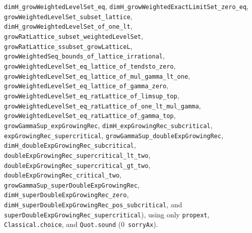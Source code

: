 \documentclass[11pt]{article}
\theoremstyle{definition}
\theoremstyle{remark}
\begin{document}
\texttt{dimH\_\allowbreak grow\allowbreak Weighted\allowbreak LevelSet\_\allowbreak eq},
\texttt{dimH\_\allowbreak grow\allowbreak Weighted\allowbreak ExactLimitSet\_\allowbreak zero\_\allowbreak eq},
\texttt{grow\allowbreak Weighted\allowbreak LevelSet\_\allowbreak subset\_\allowbreak lattice},
\texttt{dimH\_\allowbreak grow\allowbreak Weighted\allowbreak LevelSet\_\allowbreak of\_\allowbreak one\_\allowbreak lt},
\texttt{grow\allowbreak RatLattice\_\allowbreak subset\_\allowbreak weightedLevelSet},
\texttt{grow\allowbreak RatLattice\_\allowbreak ssubset\_\allowbreak growLatticeL},
\texttt{grow\allowbreak Weighted\allowbreak Seq\_\allowbreak bounds\_\allowbreak of\_\allowbreak lattice\_\allowbreak irrational},
\texttt{grow\allowbreak Weighted\allowbreak LevelSet\_\allowbreak eq\_\allowbreak lattice\_\allowbreak of\_\allowbreak tendsto\_\allowbreak zero},
\texttt{grow\allowbreak Weighted\allowbreak LevelSet\_\allowbreak eq\_\allowbreak lattice\_\allowbreak of\_\allowbreak mul\_\allowbreak gamma\_\allowbreak lt\_\allowbreak one},
\texttt{grow\allowbreak Weighted\allowbreak LevelSet\_\allowbreak eq\_\allowbreak lattice\_\allowbreak of\_\allowbreak gamma\_\allowbreak zero},
\texttt{grow\allowbreak Weighted\allowbreak LevelSet\_\allowbreak eq\_\allowbreak ratLattice\_\allowbreak of\_\allowbreak limsup\_\allowbreak top},
\texttt{grow\allowbreak Weighted\allowbreak LevelSet\_\allowbreak eq\_\allowbreak ratLattice\_\allowbreak of\_\allowbreak one\_\allowbreak lt\_\allowbreak mul\_\allowbreak gamma},
\texttt{grow\allowbreak Weighted\allowbreak LevelSet\_\allowbreak eq\_\allowbreak ratLattice\_\allowbreak of\_\allowbreak gamma\_\allowbreak top},
\texttt{growGammaSup\_\allowbreak exp\allowbreak Growing\allowbreak Rec},
\texttt{dimH\_\allowbreak exp\allowbreak Growing\allowbreak Rec\_\allowbreak sub\allowbreak critical},
\texttt{exp\allowbreak Growing\allowbreak Rec\_\allowbreak super\allowbreak critical},
\texttt{growGammaSup\_\allowbreak double\allowbreak Exp\allowbreak Growing\allowbreak Rec},
\texttt{dimH\_\allowbreak double\allowbreak Exp\allowbreak Growing\allowbreak Rec\_\allowbreak sub\allowbreak critical},
\texttt{double\allowbreak Exp\allowbreak Growing\allowbreak Rec\_\allowbreak super\allowbreak critical\_\allowbreak lt\_\allowbreak two},
\texttt{double\allowbreak Exp\allowbreak Growing\allowbreak Rec\_\allowbreak super\allowbreak critical\_\allowbreak gt\_\allowbreak two},
\texttt{double\allowbreak Exp\allowbreak Growing\allowbreak Rec\_\allowbreak critical\_\allowbreak two},
\texttt{growGammaSup\_\allowbreak super\allowbreak Double\allowbreak Exp\allowbreak Growing\allowbreak Rec},
\texttt{dimH\_\allowbreak super\allowbreak Double\allowbreak Exp\allowbreak Growing\allowbreak Rec\_\allowbreak zero},
\texttt{dimH\_\allowbreak super\allowbreak Double\allowbreak Exp\allowbreak Growing\allowbreak Rec\_\allowbreak pos\_\allowbreak sub\allowbreak critical},
and \texttt{super\allowbreak Double\allowbreak Exp\allowbreak Growing\allowbreak Rec\_\allowbreak super\allowbreak critical}), using only \texttt{propext},
\texttt{Classical.choice}, and \texttt{Quot.sound} ($0$~\texttt{sorryAx}).
\end{document}
